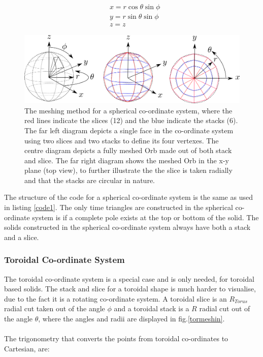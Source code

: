 \documentclass[12pt,a4paper]{article}
\begin{document}
\begin{equation}
\begin{aligned}
& x = r \cos{\theta}\sin{\phi}\\
& y = r \sin{\theta}\sin{\phi} \\
& z = z
\end{aligned}
\label{trigsph}
\end{equation}
\begin{figure}[h!]
\centering
\includegraphics[scale=0.5]{Images//Coords//sph.png}
\caption[width=\columnwidth]{The meshing method for a spherical co-ordinate system, where the red lines indicate the slices (12) and the blue indicate the stacks (6). The far left diagram depicts a single face in the co-ordinate system using two slices and two stacks to define its four vertexes. The centre diagram depicts a fully meshed Orb made out of both stack and slice. The far right diagram shows the meshed Orb in the x-y plane (top view), to further illustrate the the slice is taken radially and that the stacks are circular in nature.}
\label{sphmeshin}
\end{figure}

\noindent The structure of the code for a spherical co-ordinate system is the same as used in listing \ref{code1}. The only time triangles are constructed in the spherical co-ordinate system is if a complete pole exists at the top or bottom of the solid. The solids constructed in the spherical co-ordinate system always have both a stack and a slice.

\newpage
\subsubsection{Toroidal Co-ordinate System}

The toroidal co-ordinate system is a special case and is only needed, for toroidal based solids. The stack and slice for a toroidal shape is much harder to visualise, due to the fact it is a rotating co-ordinate system. A toroidal slice is an $R_{Torus}$ radial cut taken out of the angle $\phi$ and a toroidal stack is a $R$ radial cut out of the angle $\theta$, where the angles and radii are displayed in fig.\ref{tormeshin}. 
\\\\
The trigonometry that converts the points from toroidal co-ordinates to Cartesian, are:
\end{document}
